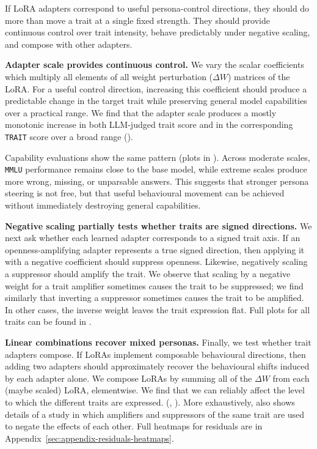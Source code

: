 If LoRA adapters correspond to useful persona-control directions, they should do more than move a trait at a single fixed strength. They should provide continuous control over trait intensity, behave predictably under negative scaling, and compose with other adapters. 

\textbf{Adapter scale provides continuous control.}\label{sec:trait-expression-combinations} We vary the scalar coefficients which multiply all elements of all weight perturbation ($\Delta W$) matrices of the LoRA. For a useful control direction, increasing this coefficient should produce a predictable change in the target trait while preserving general model capabilities over a practical range. We find that the adapter scale produces a mostly monotonic increase in both LLM-judged trait score and in the corresponding \texttt{TRAIT} score over a broad range ().

Capability evaluations show the same pattern (plots in ). Across moderate scales, \texttt{MMLU} performance remains close to the base model, while extreme scales produce more wrong, missing, or unparsable answers. This suggests that stronger persona steering is not free, but that useful behavioural movement can be achieved without immediately destroying general capabilities. 

\textbf{Negative scaling partially tests whether traits are signed directions.} We next ask whether each learned adapter corresponds to a signed trait axis. If an openness-amplifying adapter represents a true signed direction, then applying it with a negative coefficient should suppress openness. Likewise, negatively scaling a suppressor should amplify the trait. We observe that scaling by a negative weight for a trait amplifier sometimes causes the trait to be suppressed; we find similarly that inverting a suppressor sometimes causes the trait to be amplified. In other cases, the inverse weight leaves the trait expression flat. Full plots for all traits can be found in .

\textbf{Linear combinations recover mixed personas.} Finally, we test whether trait adapters compose. If LoRAs implement composable behavioural directions, then adding two adapters should approximately recover the behavioural shifts induced by each adapter alone. We compose LoRAs by summing all of the $\Delta W$ from each (maybe scaled) LoRA, elementwise. We find that we can reliably affect the level to which the different traits are expressed. (, ). More exhaustively,  also shows details of a study in which amplifiers and suppressors of the same trait are used to negate the effects of each other. Full heatmaps for residuals are in Appendix~\ref{sec:appendix-residuals-heatmaps}.

